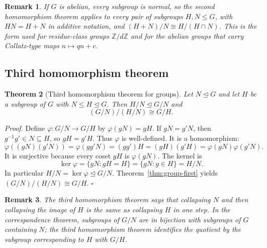 \documentclass[11pt,letterpaper]{article}
\newcommand{\Z}{\mathbb{Z}}
\newcommand{\Map}[3]{#1 \colon #2 \to #3}
\newtheorem{theorem}{Theorem}
\newtheorem{remark}[theorem]{Remark}
\newenvironment{proof}{\noindent\textit{Proof.}}{\hfill\(\square\)}
\begin{document}
\begin{remark}
If \(G\) is abelian, every subgroup is normal, so the second homomorphism theorem applies to every pair of subgroups \(H,N\leq G\), with \(HN=H+N\) in additive notation, and \((H+N)/N\cong H/(H\cap N)\). This is the form used for residue-class groups \(\Z/d\Z\) and for the abelian groups that carry Collatz-type maps \(n\mapsto qn+c\).
\end{remark}

\subsection{Third homomorphism theorem}

\begin{theorem}[Third homomorphism theorem for groups]
\label{thm:group-third}
Let \(N\trianglelefteq G\) and let \(H\) be a subgroup of \(G\) with \(N\leq H\trianglelefteq G\). Then \(H/N\trianglelefteq G/N\) and
\[
(G/N)/(H/N) \cong G/H.
\]
\end{theorem}

\begin{proof}
Define \(\Map{\varphi}{G/N}{G/H}\) by \(\varphi(gN)=gH\). If \(gN=g'N\), then \(g^{-1}g'\in N\subseteq H\), so \(gH=g'H\). Thus \(\varphi\) is well-defined. It is a homomorphism:
\[
\varphi((gN)(g'N))=\varphi(gg'N)=(gg')H=(gH)(g'H)=\varphi(gN)\varphi(g'N).
\]
It is surjective because every coset \(gH\) is \(\varphi(gN)\). The kernel is
\[
\ker\varphi=\{gN:gH=H\}=\{gN:g\in H\}=H/N.
\]
In particular \(H/N=\ker\varphi\trianglelefteq G/N\). Theorem~\ref{thm:group-first} yields \((G/N)/(H/N)\cong G/H\).
\end{proof}

\begin{center}
\end{center}

\begin{remark}
The third homomorphism theorem says that collapsing \(N\) and then collapsing the image of \(H\) is the same as collapsing \(H\) in one step. In the correspondence theorem, subgroups of \(G/N\) are in bijection with subgroups of \(G\) containing \(N\); the third homomorphism theorem identifies the quotient by the subgroup corresponding to \(H\) with \(G/H\).
\end{remark}
\end{document}
